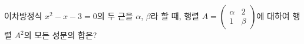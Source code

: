 이차방정식 $x^2-x-3=0$의 두 근을 $\alpha$, $\beta$라 할 때, 행렬 $A=\begin{pmatrix} \alpha & 2 \\ 1 & \beta \end{pmatrix}$에 대하여 행렬 $A^2$의 모든 성분의 합은?
